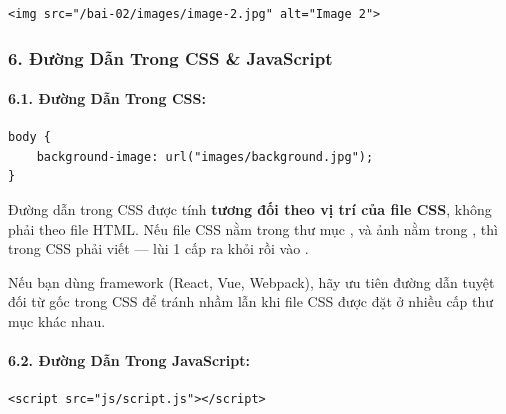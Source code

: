 \begin{codeWindow}
\begin{lstlisting}[language=HTML5]
<img src="/bai-02/images/image-2.jpg" alt="Image 2">
\end{lstlisting}
\end{codeWindow}

\subsubsection{6. Đường Dẫn Trong CSS \& JavaScript}

\paragraph{6.1. Đường Dẫn Trong CSS:}

\begin{codeWindow}
\begin{lstlisting}[language=HTML5]
body {
    background-image: url("images/background.jpg");
}
\end{lstlisting}
\end{codeWindow}

\begin{noteBox}
Đường dẫn  trong CSS được tính \textbf{tương đối theo vị trí của file CSS}, không phải theo file HTML. Nếu file CSS nằm trong thư mục , và ảnh nằm trong , thì trong CSS phải viết  — lùi 1 cấp ra khỏi  rồi vào .
\end{noteBox}

\begin{tipBox}
Nếu bạn dùng framework (React, Vue, Webpack), hãy ưu tiên đường dẫn tuyệt đối từ gốc  trong CSS để tránh nhầm lẫn khi file CSS được đặt ở nhiều cấp thư mục khác nhau.
\end{tipBox}

\paragraph{6.2. Đường Dẫn Trong JavaScript:}

\begin{codeWindow}
\begin{lstlisting}[language=HTML5]
<script src="js/script.js"></script>
\end{lstlisting}
\end{codeWindow}

